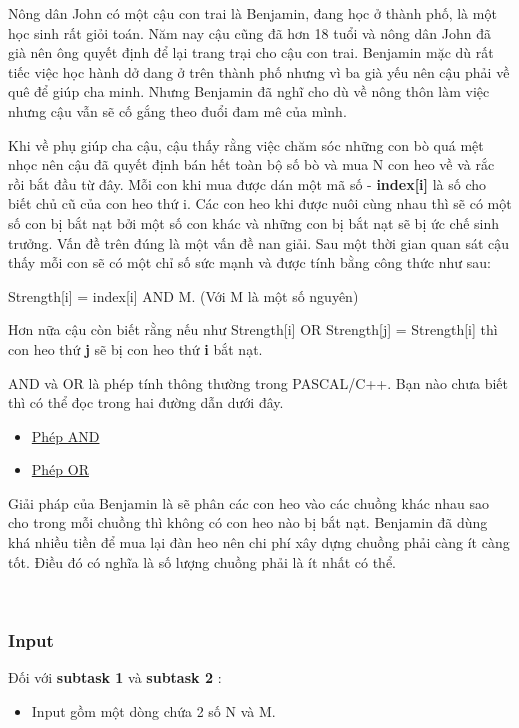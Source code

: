 

Nông dân John có một cậu con trai là Benjamin, đang học ở thành phố, là một học sinh rất giỏi toán. Năm nay cậu cũng đã hơn 18 tuổi và nông dân John đã già nên ông quyết định để lại trang trại cho cậu con trai. Benjamin mặc dù rất tiếc việc học hành dở dang ở trên thành phố nhưng vì ba già yếu nên cậu phải về quê để giúp cha minh. Nhưng Benjamin đã nghĩ cho dù về nông thôn làm việc nhưng cậu vẫn sẽ cố gắng theo đuổi đam mê của mình.

Khi về phụ giúp cha cậu, cậu thấy rằng việc chăm sóc những con bò quá mệt nhọc nên cậu đã quyết định bán hết toàn bộ số bò và mua N con heo về và rắc rồi bắt đầu từ đây. Mỗi con khi mua được dán một mã số - \textbf{ index[i] } là số cho biết chủ cũ của con heo thứ i. Các con heo khi được nuôi cùng nhau thì sẽ có một số con bị bắt nạt bởi một số con khác và những con bị bắt nạt sẽ bị ức chế sinh trưởng. Vấn đề trên đúng là một vấn đề nan giải. Sau một thời gian quan sát cậu thấy mỗi con sẽ có một chỉ số sức mạnh và được tính bằng công thức như sau:

Strength[i] = index[i] AND M. (Với M là một số nguyên)

Hơn nữa cậu còn biết rằng nếu như Strength[i] OR Strength[j] = Strength[i] thì con heo thứ \textbf{ j } sẽ bị con heo thứ \textbf{ i } bắt nạt.

AND và OR là phép tính thông thường trong PASCAL/C++. Bạn nào chưa biết thì có thể đọc trong hai đường dẫn dưới đây.
\begin{itemize}
	\item \href{http://vi.wikipedia.org/wiki/Ph%C3%A9p_to%C3%A1n_thao_t%C3%A1c_bit#AND}{Phép AND }
	\item \href{http://vi.wikipedia.org/wiki/Ph%C3%A9p_to%C3%A1n_thao_t%C3%A1c_bit#OR}{Phép OR }
\end{itemize}

Giải pháp của Benjamin là sẽ phân các con heo vào các chuồng khác nhau sao cho trong mỗi chuồng thì không có con heo nào bị bắt nạt. Benjamin đã dùng khá nhiều tiền để mua lại đàn heo nên chi phí xây dựng chuồng phải càng ít càng tốt. Điều đó có nghĩa là số lượng chuồng phải là ít nhất có thể.

 

\subsubsection{Input}

Đối với \textbf{ subtask 1 } và \textbf{ subtask 2 } :
\begin{itemize}
	\item Input gồm một dòng chứa 2 số N và M.
\end{itemize}

